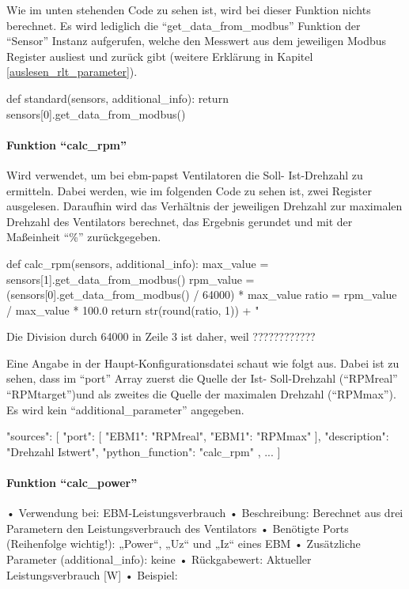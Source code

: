 Wie im unten stehenden Code zu sehen ist, wird bei dieser Funktion nichts berechnet. Es wird lediglich die \enquote{get\_data\_from\_modbus} Funktion der \enquote{Sensor} Instanz aufgerufen, welche den Messwert aus dem jeweiligen Modbus Register ausliest und zurück gibt (weitere Erklärung in Kapitel \ref{auslesen_rlt_parameter}).

\begin{pythoncode}
def standard(sensors, additional_info):
	return sensors[0].get_data_from_modbus()
\end{pythoncode}


\paragraph{Funktion \enquote{calc\_rpm}}
Wird verwendet, um bei ebm-papst Ventilatoren die Soll- \bzw Ist-Drehzahl zu ermitteln. Dabei werden, wie im folgenden Code zu sehen ist, zwei Register ausgelesen. Daraufhin wird das Verhältnis der jeweiligen Drehzahl zur maximalen Drehzahl des Ventilators berechnet, das Ergebnis gerundet und mit der Maßeinheit \enquote{\%} zurückgegeben.

\begin{pythoncode}
def calc_rpm(sensors, additional_info):
	max_value = sensors[1].get_data_from_modbus()
	rpm_value = (sensors[0].get_data_from_modbus() / 64000) * max_value
	ratio = rpm_value / max_value * 100.0
	return str(round(ratio, 1)) + " %
\end{pythoncode}

Die Division durch 64000 in Zeile 3 ist daher, weil ????????????

Eine Angabe in der Haupt-Konfigurationsdatei schaut wie folgt aus. Dabei ist zu sehen, dass im \enquote{port} Array zuerst die Quelle der Ist- \bzw Soll-Drehzahl (\enquote{RPMreal} \bzw \enquote{RPMtarget})und als zweites die Quelle der maximalen Drehzahl (\enquote{RPMmax}). Es wird kein \enquote{additional\_parameter} angegeben.

\begin{jsoncode}
"sources": [
	{
		"port": [
		{"EBM1": "RPMreal"},
		{"EBM1": "RPMmax"}
		],
		"description": "Drehzahl Istwert",
		"python_function": "calc_rpm"
	},
	...
]
\end{jsoncode}

\paragraph{Funktion \enquote{calc\_power}}
• Verwendung bei: EBM-Leistungsverbrauch
• Beschreibung: Berechnet aus drei Parametern den Leistungsverbrauch des Ventilators
• Benötigte Ports (Reihenfolge wichtig!): „Power“, „Uz“ und „Iz“ eines EBM
• Zusätzliche Parameter (additional\_info): keine
• Rückgabewert: Aktueller Leistungsverbrauch [W]
• Beispiel:

